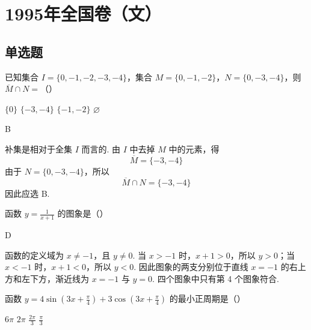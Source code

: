 \chapter{1995年全国卷（文）}
\section{单选题}

\begin{problem}
已知集合 \(I = \{0, -1, -2, -3, -4\}\)，集合 \(M = \{0, -1, -2\}\)，\(N = \{0, -3, -4\}\)，则 \(\overline{M} \cap N =\)（\quad）

\choices
    {\(\{0\}\)}
    {\(\{-3,-4\} \)}
    {\(\{-1,-2\} \)}
    {\(\varnothing\)}
\end{problem}

\begin{answer}
B
\end{answer}

\begin{solution}
补集是相对于全集 \(I\) 而言的. 由 \(I\) 中去掉 \(M\) 中的元素，得
\[
\overline{M}=\{-3,-4\}
\]
由于 \(N=\{0,-3,-4\}\)，所以
\[
\overline{M}\cap N=\{-3,-4\}
\]
因此应选 B.
\end{solution}

\begin{problem}
函数 \(y = \frac{1}{x + 1} \) 的图象是（\quad）

    {}
    {}
    {}
\end{problem}

\begin{answer}
D
\end{answer}

\begin{solution}
函数的定义域为 \(x\ne-1\)，且 \(y\ne0\). 当 \(x>-1\) 时，\(x+1>0\)，所以 \(y>0\)；当 \(x<-1\) 时，\(x+1<0\)，所以 \(y<0\). 因此图象的两支分别位于直线 \(x=-1\) 的右上方和左下方，渐近线为 \(x=-1\) 与 \(y=0\). 四个图象中只有第 4 个图象符合.
\end{solution}

\begin{problem}
函数 \(y = 4\sin \left(3x + \frac{\pi}{4}\right) + 3\cos \left(3x + \frac{\pi}{4}\right) \) 的最小正周期是（\quad）

\choices
    {\(6\pi\)}
    {\(2\pi\)}
    {\(\frac{2\pi}{3} \)}
    {\(\frac{\pi}{3}\)}
\end{problem}

